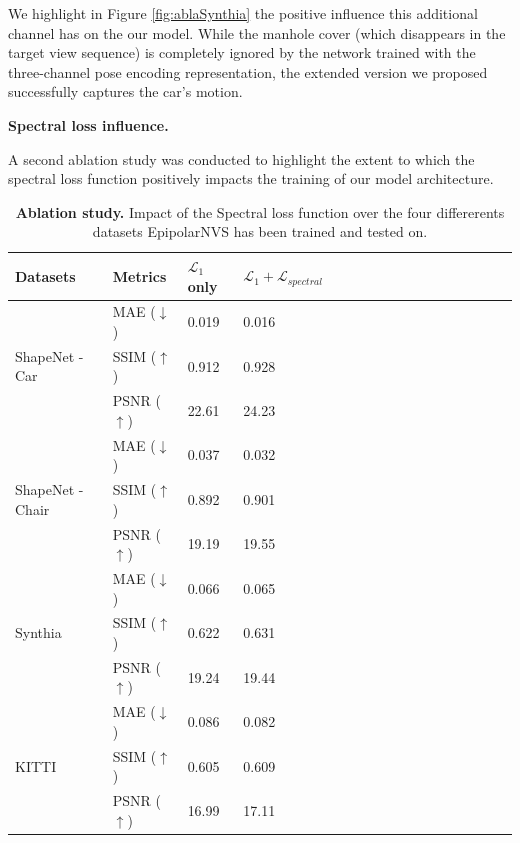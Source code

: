 We highlight in Figure \ref{fig:ablaSynthia} the positive influence this additional channel has on the our model. While the manhole cover (which disappears in the target view sequence) is completely  ignored by the network trained with the three-channel pose encoding representation, the extended version we proposed successfully captures the car's motion.\newline 

\textbf{Spectral loss influence.}

A second ablation study was conducted to highlight the extent to which the spectral loss function positively impacts the training of our model architecture. 
\begin{table}[h!]
    \caption{\textbf{Ablation study.} Impact of the Spectral loss function over the four differerents datasets EpipolarNVS has been trained and tested on.}
    \label{tab:spectral}
\begin{center}
\begin{tabular}{@{}||lllllllllllllllll@{}}
  \toprule
  Datasets & Metrics  &$\mathcal{L}_{1}$ only  &  $\mathcal{L}_{1}+\mathcal{L}_{spectral}$ &   \\
  \midrule
  \multirow{3}{*}{ShapeNet - Car \citep{chang2015shapenet}} & MAE ($\downarrow$) &\hfil 0.019 & \hfil  \cellcolor{red!25}0.016 \\
  & SSIM ($\uparrow$) & \hfil0.912 & \hfil \cellcolor{red!25}0.928\\
  & PSNR ($\uparrow$)& \hfil22.61 & \hfil \cellcolor{red!25}24.23\\
  \midrule
  \multirow{3}{*}{ShapeNet - Chair \citep{chang2015shapenet}} & MAE ($\downarrow$) & \hfil 0.037 & \hfil \cellcolor{red!25}0.032\\
  & SSIM ($\uparrow$)&\hfil 0.892 & \hfil \cellcolor{red!25}0.901 \\
  & PSNR ($\uparrow$) & \hfil 19.19 & \hfil \cellcolor{red!25}19.55 \\
  \midrule
  \multirow{3}{*}{Synthia \citep{ros2016synthia}} & MAE ($\downarrow$)& \hfil 0.066 & \hfil \cellcolor{red!25}0.065\\
  & SSIM ($\uparrow$)& \hfil 0.622 & \hfil \cellcolor{red!25}0.631 \\
  & PSNR ($\uparrow$)& \hfil 19.24 & \hfil \cellcolor{red!25}19.44\\
  \midrule
  \multirow{3}{*}{KITTI \citep{geiger2012we}} & MAE ($\downarrow$)& \hfil 0.086 & \hfil \cellcolor{red!25}0.082\\
  & SSIM ($\uparrow$)& \hfil 0.605 & \hfil \cellcolor{red!25}0.609 \\
  & PSNR ($\uparrow$)& \hfil 16.99 & \hfil \cellcolor{red!25}17.11\\\hline

\end{tabular}
\end{center}
\end{table}

